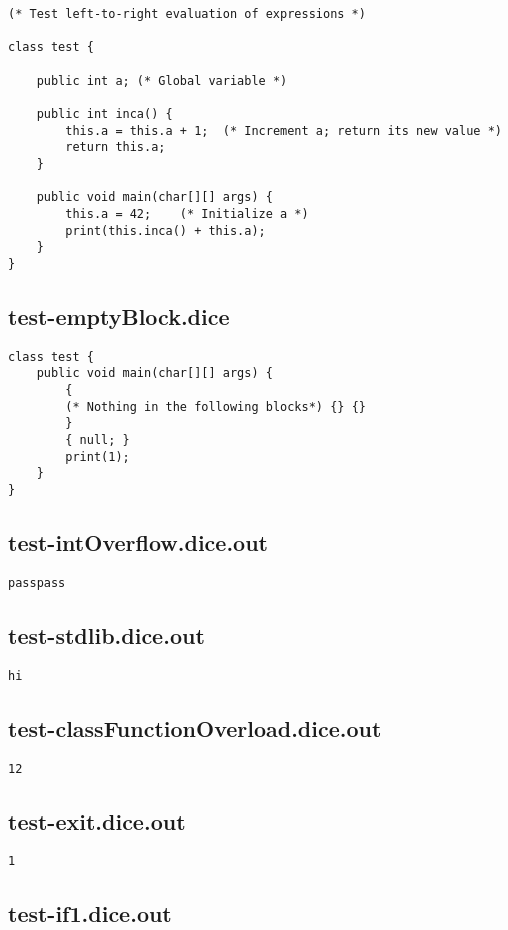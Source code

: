 \begin{verbatim}
(* Test left-to-right evaluation of expressions *)

class test {

	public int a; (* Global variable *)

	public int inca() { 
		this.a = this.a + 1;  (* Increment a; return its new value *)
		return this.a; 
	} 

	public void main(char[][] args) {
  		this.a = 42;    (* Initialize a *)
  		print(this.inca() + this.a);
	}
}

\end{verbatim}\pagebreak\subsection{test-emptyBlock.dice}
\begin{verbatim}
class test {
	public void main(char[][] args) {
		{
		(* Nothing in the following blocks*) {} {}
		}
		{ null; }
		print(1);
	}
}

\end{verbatim}\pagebreak\subsection{test-intOverflow.dice.out}
\begin{verbatim}
passpass
\end{verbatim}\pagebreak\subsection{test-stdlib.dice.out}
\begin{verbatim}
hi
\end{verbatim}\pagebreak\subsection{test-classFunctionOverload.dice.out}
\begin{verbatim}
12
\end{verbatim}\pagebreak\subsection{test-exit.dice.out}
\begin{verbatim}
1
\end{verbatim}\pagebreak\subsection{test-if1.dice.out}

